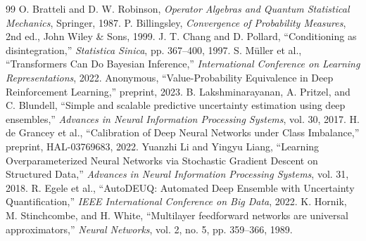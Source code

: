 \documentclass[11pt,a4paper]{report}
\begin{document}
\begin{thebibliography}{99}
 O. Bratteli and D. W. Robinson, \emph{Operator Algebras and Quantum Statistical Mechanics}, Springer, 1987.
 P. Billingsley, \emph{Convergence of Probability Measures}, 2nd ed., John Wiley \& Sons, 1999.
 J. T. Chang and D. Pollard, ``Conditioning as disintegration,'' \emph{Statistica Sinica}, pp. 367--400, 1997.
 S. M\"{u}ller et al., ``Transformers Can Do Bayesian Inference,'' \emph{International Conference on Learning Representations}, 2022.
 Anonymous, ``Value-Probability Equivalence in Deep Reinforcement Learning,'' preprint, 2023.
 B. Lakshminarayanan, A. Pritzel, and C. Blundell, ``Simple and scalable predictive uncertainty estimation using deep ensembles,'' \emph{Advances in Neural Information Processing Systems}, vol. 30, 2017.
 H. de Grancey et al., ``Calibration of Deep Neural Networks under Class Imbalance,'' preprint, HAL-03769683, 2022.
 Yuanzhi Li and Yingyu Liang, ``Learning Overparameterized Neural Networks via Stochastic Gradient Descent on Structured Data,'' \emph{Advances in Neural Information Processing Systems}, vol. 31, 2018.
 R. Egele et al., ``AutoDEUQ: Automated Deep Ensemble with Uncertainty Quantification,'' \emph{IEEE International Conference on Big Data}, 2022.
 K. Hornik, M. Stinchcombe, and H. White, ``Multilayer feedforward networks are universal approximators,'' \emph{Neural Networks}, vol. 2, no. 5, pp. 359--366, 1989.
\end{thebibliography}
\end{document}
